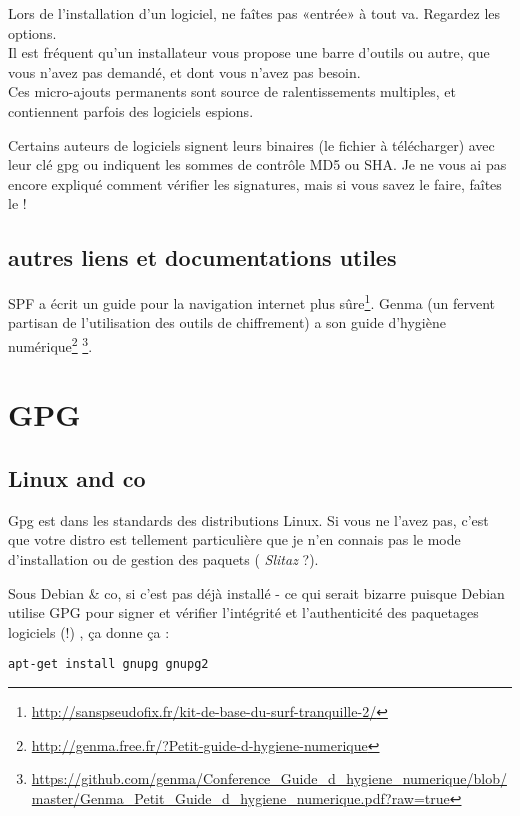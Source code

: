 Lors de l'installation d'un logiciel, ne faîtes pas «entrée» à tout va.
Regardez les options.\\Il est fréquent qu'un installateur vous propose
une barre d'outils ou autre, que vous n'avez pas demandé, et dont vous
n'avez pas besoin.\\Ces micro-ajouts permanents sont source de
ralentissements multiples, et contiennent parfois des logiciels espions.

Certains auteurs de logiciels signent leurs binaires (le fichier à
télécharger) avec leur clé gpg ou indiquent les sommes de contrôle MD5
ou SHA. Je ne vous ai pas encore expliqué comment vérifier les
signatures, mais si vous savez le faire, faîtes le !

\subsection{autres liens et documentations utiles}

SPF a écrit un guide pour la navigation internet plus sûre\footnote{\url{http://sanspseudofix.fr/kit-de-base-du-surf-tranquille-2/}}.
Genma (un fervent partisan de l'utilisation des outils de chiffrement) a son guide d'hygiène numérique\footnote{\url{http://genma.free.fr/?Petit-guide-d-hygiene-numerique}} \footnote{\url{https://github.com/genma/Conference_Guide_d_hygiene_numerique/blob/master/Genma_Petit_Guide_d_hygiene_numerique.pdf?raw=true}}.

\section{GPG}\label{gpg}

\subsection{Linux and co}\label{linux-and-co}

Gpg est dans les standards des distributions Linux. Si vous ne l'avez
pas, c'est que votre distro est tellement particulière que je n'en
connais pas le mode d'installation ou de gestion des paquets (
\emph{Slitaz} ?).

Sous Debian \& co, si c'est pas déjà installé - ce qui serait bizarre
puisque Debian utilise GPG pour signer et vérifier l'intégrité et
l'authenticité des paquetages logiciels (!) , ça donne ça :

\begin{lstlisting}
apt-get install gnupg gnupg2
\end{lstlisting}

